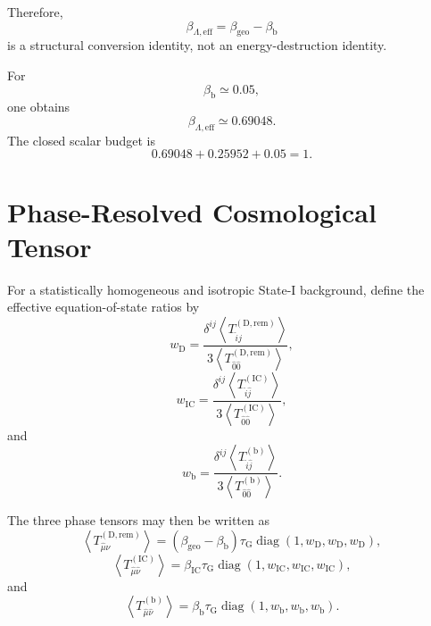 Therefore,
\begin{equation}
    \beta_{\Lambda,\mathrm{eff}} = \beta_{\mathrm{geo}} - \beta_{\mathrm{b}}
\end{equation}
is a structural conversion identity, not an energy-destruction identity.

For
\begin{equation}
    \beta_{\mathrm{b}}\simeq0.05,
\end{equation}
one obtains
\begin{equation}
    \beta_{\Lambda,\mathrm{eff}} \simeq0.69048.
\end{equation}
The closed scalar budget is
\begin{equation}
    0.69048+0.25952+0.05=1.
\end{equation}

\section{Phase-Resolved Cosmological Tensor}

For a statistically homogeneous and isotropic State-I background, define the effective equation-of-state ratios by
\begin{equation}
    w_{\mathrm{D}} = \frac{ \delta^{ij} \left\langle T_{\hat{i}\hat{j}}^{(\mathrm{D},\mathrm{rem})} \right\rangle }{ 3 \left\langle T_{\hat{0}\hat{0}}^{(\mathrm{D},\mathrm{rem})} \right\rangle },
\end{equation}
\begin{equation}
    w_{\mathrm{IC}} = \frac{ \delta^{ij} \left\langle T_{\hat{i}\hat{j}}^{(\mathrm{IC})} \right\rangle }{ 3 \left\langle T_{\hat{0}\hat{0}}^{(\mathrm{IC})} \right\rangle },
\end{equation}
and
\begin{equation}
    w_{\mathrm{b}} = \frac{ \delta^{ij} \left\langle T_{\hat{i}\hat{j}}^{(\mathrm{b})} \right\rangle }{ 3 \left\langle T_{\hat{0}\hat{0}}^{(\mathrm{b})} \right\rangle }.
\end{equation}

The three phase tensors may then be written as
\begin{equation}
    \left\langle T_{\hat{\mu}\hat{\nu}}^{(\mathrm{D},\mathrm{rem})} \right\rangle = \left( \beta_{\mathrm{geo}} - \beta_{\mathrm{b}} \right) \tau_{\mathrm{G}} \operatorname{diag} \left( 1,w_{\mathrm{D}},w_{\mathrm{D}},w_{\mathrm{D}} \right),
\end{equation}
\begin{equation}
    \left\langle T_{\hat{\mu}\hat{\nu}}^{(\mathrm{IC})} \right\rangle = \beta_{\mathrm{IC}} \tau_{\mathrm{G}} \operatorname{diag} \left( 1,w_{\mathrm{IC}},w_{\mathrm{IC}},w_{\mathrm{IC}} \right),
\end{equation}
and
\begin{equation}
    \left\langle T_{\hat{\mu}\hat{\nu}}^{(\mathrm{b})} \right\rangle = \beta_{\mathrm{b}} \tau_{\mathrm{G}} \operatorname{diag} \left( 1,w_{\mathrm{b}},w_{\mathrm{b}},w_{\mathrm{b}} \right).
\end{equation}

